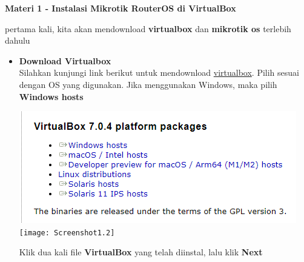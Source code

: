 \documentclass{article}
\begin{document}
    \begin{flushleft}
        \textbf{Materi 1 - Instalasi Mikrotik RouterOS di VirtualBox}

        pertama kali, kita akan mendownload \textbf{virtualbox} dan \textbf{mikrotik os} terlebih dahulu \\
        
        \begin{itemize}

        	
			\item \textbf{Download Virtualbox} \\
				Silahkan kunjungi link berikut untuk mendownload \href{https://www.virtualbox.org/}{virtualbox}. Pilih sesuai dengan OS yang digunakan. Jika menggunakan Windows, maka pilih \textbf{Windows hosts} \\
				
				\begin{center}
					\includegraphics[scale=0.3]{Screenshot1} \\
					\texttt{[image: Screenshot1.2]} \\       	
        		\end{center}
				
				Klik dua kali file \textbf{VirtualBox} yang telah diinstal, lalu klik \textbf{Next}
				

\end{itemize}
\end{flushleft}
\end{document}
